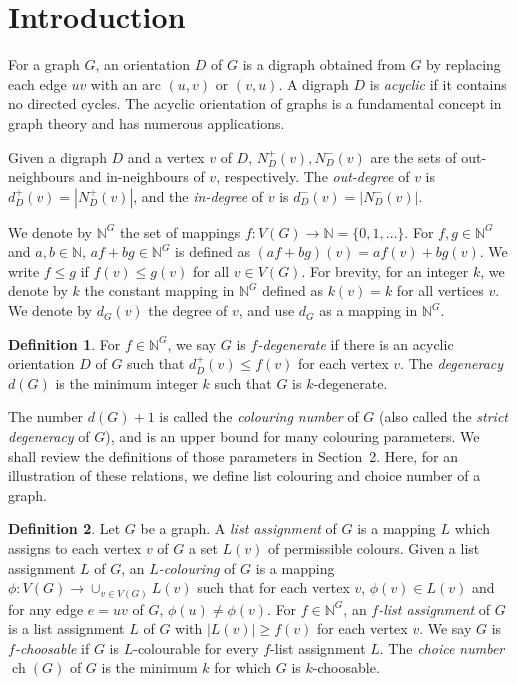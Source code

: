 \documentclass[11pt,a4paper]{article}
\theoremstyle{definition}
\newtheorem{definition}{Definition}
\begin{document}
	\section{Introduction}	
	
	For a graph $G$, an orientation $D$ of $G$ is a digraph  obtained from $G$ by replacing each edge $uv$ with an arc $(u,v)$ or $(v,u)$.    A digraph  $D$
is   {\em acyclic} if it contains no directed cycles. The acyclic orientation of  graphs is a fundamental concept in graph theory and has numerous applications. 

	Given a digraph $D$ and a vertex $v$ of $D$, $N_D^+(v), N_D^-(v)$ are the sets of out-neighbours and in-neighbours of $v$, respectively. The {\em out-degree} of $v$ is $d_D^+(v)=|N_D^+(v)|$, and the {\em in-degree} of $v$ is $d_D^-(v)=|N_D^-(v)|$. 

We denote by $\mathbb{N}^G$ the set of mappings $f: V(G) \to \mathbb{N}=\{0,1,\ldots\}$. For $f,g \in \mathbb{N}^G$ and $a, b \in \mathbb{N}$,  $af+ bg \in \mathbb{N}^G$  is defined as $(af+bg)(v)=af(v)+bg(v)$.  We write $f \le g$ if $f(v) \le g(v)$ for all $v \in V(G)$. For brevity, for an integer $k$, we denote by $k$ the constant mapping in $\mathbb{N}^G$ defined as $k(v)=k$ for all vertices $v$.  We denote by $d_G(v)$ the degree of $v$, and use $d_G$ as a mapping in $ \mathbb{N}^G$.   

	\begin{definition}
		\label{def-degenerate}
		For $f \in \mathbb{N}^G$, we say $G$ is \emph{$f$-degenerate} if there is an acyclic orientation $D$ of $G$ such that 
		$d_D^+(v) \le  f(v)$ for each vertex $v$.     
  The \emph{degeneracy} $d(G)$ is the minimum integer $k$ such that $G$ is  $k$-degenerate.  
  \end{definition}

    
	The number  $d(G)+1$ is called the  {\em colouring number} of $G$ (also called the {\em strict degeneracy} of $G$), and  is an upper bound for many colouring parameters. We shall review the definitions of those parameters in Section~2. Here, for an illustration of these relations,  we  define   list colouring and choice number   of a graph. 
 
 \begin{definition}
    \label{def-list}
    Let $G$ be a graph. A {\em list assignment} of $G$ is a mapping $L$ which assigns to each vertex $v$ of $G$ a set $L(v)$ of permissible colours. Given  a list assignment $L$ of $G$, an {\em $L$-colouring} of $G$ is a mapping $\phi: V(G) \to \cup_{v \in V(G)}L(v)$ such that for each vertex $v$, $\phi(v) \in L(v)$ and for any edge $e=uv$ of $G$, $\phi(u)\ne \phi(v)$. For $f \in \mathbb{N}^G$, an {\em $f$-list assignment} of $G$ is a list assignment $L$ of $G$ with $|L(v)| \ge f(v)$ for each vertex $v$. We say $G$ is {\em $f$-choosable} if $G$ is $L$-colourable for every $f$-list assignment $L$. The {\em choice number} $\operatorname{ch}(G)$ of $G$ is the minimum $k$ for which $G$ is $k$-choosable.
\end{definition}
 
\end{document}
